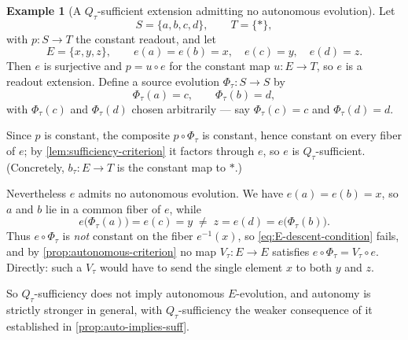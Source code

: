 \documentclass[11pt,reqno]{amsart}
\theoremstyle{plain}
\theoremstyle{definition}
\newtheorem{example}[theorem]{Example}
\newcommand{\Src}{S}
\newcommand{\Rdt}{T}
\begin{document}
\begin{example}[A $Q_\tau$-sufficient extension admitting no autonomous evolution]
\label{ex:suff-not-autonomous}
Let
\begin{equation*}
\Src=\{a,b,c,d\},
\qquad
\Rdt=\{*\},
\end{equation*}
with $p\colon\Src\to\Rdt$ the constant readout, and let
\begin{equation*}
E=\{x,y,z\},
\qquad
e(a)=e(b)=x,
\quad
e(c)=y,
\quad
e(d)=z .
\end{equation*}
Then $e$ is surjective and $p=u\circ e$ for the constant map $u\colon E\to\Rdt$, so $e$ is a
readout extension. Define a source evolution $\Phi_\tau\colon\Src\to\Src$ by
\begin{equation*}
\Phi_\tau(a)=c,
\qquad
\Phi_\tau(b)=d,
\end{equation*}
with $\Phi_\tau(c)$ and $\Phi_\tau(d)$ chosen arbitrarily --- say $\Phi_\tau(c)=c$ and
$\Phi_\tau(d)=d$.

Since $p$ is constant, the composite $p\circ\Phi_\tau$ is constant, hence constant on every fiber
of $e$; by \cref{lem:sufficiency-criterion} it factors through $e$, so $e$ is $Q_\tau$-sufficient.
(Concretely, $b_\tau\colon E\to\Rdt$ is the constant map to $*$.)

Nevertheless $e$ admits no autonomous evolution. We have $e(a)=e(b)=x$, so $a$ and $b$ lie in a
common fiber of $e$, while
\begin{equation*}
e\bigl(\Phi_\tau(a)\bigr)=e(c)=y
\;\neq\;
z=e(d)=e\bigl(\Phi_\tau(b)\bigr).
\end{equation*}
Thus $e\circ\Phi_\tau$ is \emph{not} constant on the fiber $e^{-1}(x)$, so
\eqref{eq:E-descent-condition} fails, and by \cref{prop:autonomous-criterion} no map
$V_\tau\colon E\to E$ satisfies $e\circ\Phi_\tau=V_\tau\circ e$. Directly: such a $V_\tau$ would
have to send the single element $x$ to both $y$ and $z$.
\end{example}

So $Q_\tau$-sufficiency does not imply autonomous $E$-evolution, and autonomy is strictly stronger
in general, with $Q_\tau$-sufficiency the weaker consequence of it established in
\cref{prop:auto-implies-suff}.
\end{document}
